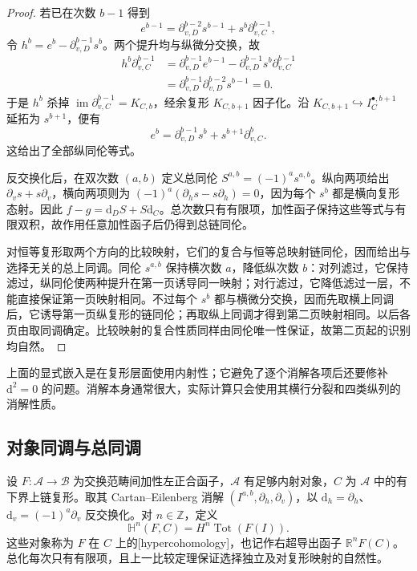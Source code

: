 \begin{proof}
	若已在次数 \(b-1\) 得到
	\[
		e^{b-1}=\partial_{v,D}^{b-2}s^{b-1} +s^b\partial_{v,C}^{b-1},
	\]
	令 \(h^b=e^b-\partial_{v,D}^{b-1}s^b\)。两个提升均与纵微分交换，故
	\[
		\begin{aligned}
			h^b\partial_{v,C}^{b-1} &=\partial_{v,D}^{b-1}e^{b-1} -\partial_{v,D}^{b-1}s^b\partial_{v,C}^{b-1}\\
			&=\partial_{v,D}^{b-1}\partial_{v,D}^{b-2}s^{b-1}=0.
		\end{aligned}
	\]
	于是 \(h^b\) 杀掉 \(\operatorname{im}\partial_{v,C}^{b-1}=K_{C,b}\)，经余复形 \(K_{C,b+1}\) 因子化。沿 \(K_{C,b+1}\hookrightarrow I_C^{\bullet,b+1}\) 延拓为 \(s^{b+1}\)，便有
	\[
		e^b=\partial_{v,D}^{b-1}s^b+s^{b+1}\partial_{v,C}^b.
	\]
	这给出了全部纵同伦等式。

	反交换化后，在双次数 \((a,b)\) 定义总同伦 \(S^{a,b}=(-1)^as^{a,b}\)。纵向两项给出 \(\partial_vs+s\partial_v\)，横向两项则为 \((-1)^a(\partial_hs-s\partial_h)=0\)，因为每个 \(s^b\) 都是横向复形态射。因此 \(f-g=\mathrm d_DS+S\mathrm d_C\)。总次数只有有限项，加性函子保持这些等式与有限双积，故作用任意加性函子后仍得到总链同伦。

	对恒等复形取两个方向的比较映射，它们的复合与恒等总映射链同伦，因而给出与选择无关的总上同调。同伦 \(s^{a,b}\) 保持横次数 \(a\)，降低纵次数 \(b\)：对列滤过，它保持滤过，纵同伦使两种提升在第一页诱导同一映射；对行滤过，它降低滤过一层，不能直接保证第一页映射相同。不过每个 \(s^b\) 都与横微分交换，因而先取横上同调后，它诱导第一页纵复形的链同伦；再取纵上同调才得到第二页映射相同。以后各页由取同调确定。比较映射的复合性质同样由同伦唯一性保证，故第二页起的识别均自然。
\end{proof}

上面的显式嵌入是在复形层面使用内射性；它避免了逐个消解各项后还要修补 \(\mathrm{d}^2=0\) 的问题。消解本身通常很大，实际计算只会使用其横行分裂和四类纵列的消解性质。

\subsection{对象同调与总同调}
\label{b4:subsec:1502:03}

\begin{definition}\label{b4:def:hypercohomology}
	设 \(F:\mathcal A\to\mathcal B\) 为交换范畴间加性左正合函子，\(\mathcal A\) 有足够内射对象，\(C\) 为 \(\mathcal A\) 中的有下界上链复形。取其 Cartan--Eilenberg 消解 \((I^{a,b},\partial_h,\partial_v)\)，以 \(\mathrm d_h=\partial_h\)、\(\mathrm d_v=(-1)^a\partial_v\) 反交换化。对 \(n\in\mathbb Z\)，定义
	\[
		\mathbb H^n(F,C)=H^n\operatorname{Tot}(F(I)).
	\]
	这些对象称为 \(F\) 在 \(C\) 上的[hypercohomology]，也记作右超导出函子 \(\mathbb R^nF(C)\)。总化每次只有有限项，且上一比较定理保证选择独立及对复形映射的自然性。
\end{definition}

